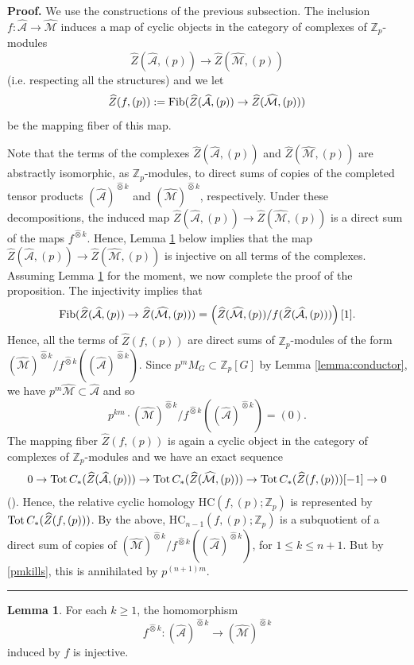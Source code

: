 \documentclass[reqno,11pt,letterpaper]{amsart}
\theoremstyle{plain}
\numberwithin{equation}{subsection}
\newtheorem{lemma}[equation]{Lemma}
\theoremstyle{remark}
\theoremstyle{plain}
\theoremstyle{definition}\newtheorem*{notation}{Notation}
\newcommand{\A}{{\mathcal A}}
\newcommand{\M}{{\mathcal M}}
\newtheorem{lemma}[theorem]{Lemma}
\newenvironment{proof}[1][Proof]{\noindent\textbf{#1.} }{\ \rule{0.5em}{0.5em}}
\newcommand{\BZ}{\mathbb{Z}}
\newcommand{\HC}{\mathrm{HC}}
\newcommand{\wh}{\widehat}
\begin{document}
\begin{proof} We use the constructions of the previous subsection.
The inclusion $f: \wh \A\to \wh \M$
 induces a map of cyclic objects in the category of complexes of $\BZ_p$-modules
 \[
 \wh Z(\wh \A, (p))\to  \wh Z(\wh \M, (p))
 \]
 (i.e. respecting all the structures) and we let 
 \[
\wh Z(f, (p)):={\rm Fib}(\wh Z(\wh \A, (p))\to  \wh Z(\wh \M, (p)))
\]
be the mapping fiber of this map.


 Note that the terms of the complexes $\wh Z(\wh \A, (p))$ and $\wh Z(\wh \M, (p))$ are abstractly isomorphic, as $\BZ_p$-modules, to direct sums of copies of the   completed tensor products $(\wh \A)^{\hat\otimes k}$ and $(\wh \M)^{\hat\otimes k}$, respectively.  Under these decompositions, the induced map
 $\wh Z(\wh \A, (p))\to  \wh Z(\wh \M, (p))$ is a direct sum of the maps $f^{\hat \otimes k}$.
 Hence, Lemma \ref{lemma:incl} below implies that 
the map $\wh Z(\wh \A, (p))\to  \wh Z(\wh \M, (p))$  is injective on all terms of the complexes. Assuming Lemma \ref{lemma:incl} for the moment, we now complete the proof of the proposition.
The injectivity implies that
\[
{\rm Fib}(\wh Z(\wh \A, (p))\to  \wh Z(\wh \M, (p)))= \left(\wh Z(\wh \M, (p))/f(\wh Z(\wh \A, (p)))\right)[1].
\]
Hence, all the terms of  $\wh Z(f, (p)) $ are direct sums of $\BZ_p$-modules of the form 
$ (\wh \M)^{\hat\otimes k}/f^{\hat\otimes k}( (\wh \A)^{\hat\otimes k})$. Since $p^mM_G\subset \BZ_p[G]$ by Lemma \ref{lemma:conductor}, we have
$p^m \wh \M\subset \wh \A$ and so
\begin{equation}\label{pmkills}
p^{km}\cdot (\wh \M)^{\hat\otimes k}/f^{\hat\otimes k}( (\wh \A)^{\hat\otimes k})=(0).
\end{equation}
The mapping fiber $ \wh Z(f, (p))$  is again a cyclic object in the category of complexes of $\BZ_p$-modules and we have an exact sequence
\[
0\to {\rm Tot}\, C_*(\wh Z(\wh \A, (p)))\to  {\rm Tot}\, C_*(\wh Z(\wh \M, (p)))\to {\rm Tot}\, C_*(\wh Z(f, (p)))[-1]\to 0
\]
 (\cite[Prop. 2.7]{GoodTop}). Hence, the relative cyclic homology $\HC(f, (p);\BZ_p)$ is represented by ${\rm Tot}\, C_*(\wh Z(f, (p)))$. By the above,  
$\HC_{n-1}(f, (p);\BZ_p)$ is a subquotient of a direct sum of copies of $(\wh \M)^{\hat\otimes k}/f^{\hat\otimes k}( (\wh \A)^{\hat\otimes k})$,
for $1\leq k\leq n+1$. But by \eqref{pmkills}, this is annihilated by $p^{(n+1)m}$.
\end{proof}
 
  \begin{lemma}\label{lemma:incl}
 For each $k\geq 1$, the homomorphism
 \[
 f^{\hat \otimes k}: (\wh \A)^{\hat\otimes k}\to (\wh \M)^{\hat\otimes k}
 \]
 induced by $f$ is injective.
 \end{lemma}
 
\end{document}
